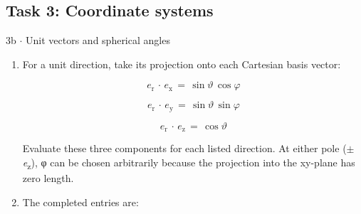 \documentclass[11pt]{article}
\begin{document}
\begin{keepsection}\subsection{Task 3: Coordinate systems}

\begin{workedbox}{3b \ensuremath{\cdot} Unit vectors and spherical angles}
\begin{enumerate}
\item {}
For a unit direction, take its projection onto each Cartesian basis vector:

\begin{equation*}{e}_{\mathrm{r}}\, \cdot \, {e}_{\mathrm{x}}\, =\, \sin {ϑ}\, \cos {φ}\end{equation*}

\begin{equation*}{e}_{\mathrm{r}}\, \cdot \, {e}_{\mathrm{y}}\, =\, \sin {ϑ}\, \sin {φ}\end{equation*}

\begin{equation*}{e}_{\mathrm{r}}\, \cdot \, {e}_{\mathrm{z}}\, =\, \cos {ϑ}\end{equation*}

Evaluate these three components for each listed direction. At either pole (\ensuremath{\pm}\textit{e}\textsubscript{z}), φ can be chosen arbitrarily because the projection into the xy-plane has zero length.
\item {}
The completed entries are:


\end{enumerate}
\end{workedbox}
\end{keepsection}
\end{document}
